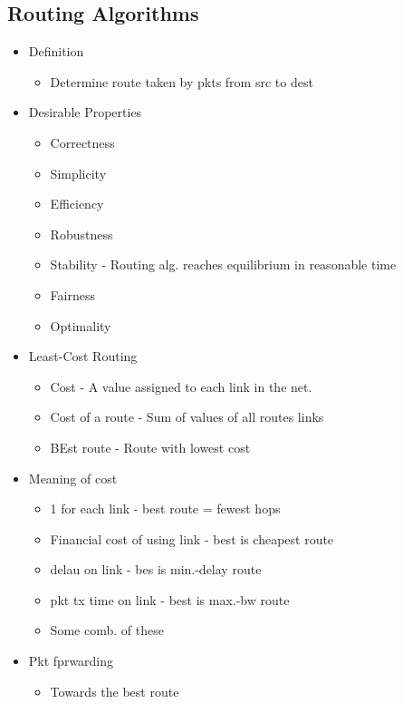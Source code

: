 \documentclass[a4paper]{article}
\begin{document}
\subsection{Routing Algorithms}
\begin{itemize}
	\item Definition
	\begin{itemize}
		\item Determine route taken by pkts from src to dest
	\end{itemize}
	\item Desirable Properties
	\begin{itemize}
		\item Correctness
		\item Simplicity
		\item Efficiency
		\item Robustness
		\item Stability - Routing alg. reaches equilibrium in reasonable
			time
		\item Fairness
		\item Optimality
	\end{itemize}
	\item Least-Cost Routing
	\begin{itemize}
		\item Cost - A value assigned to each link in the net.
		\item Cost of a route - Sum of values of all routes links
		\item BEst route - Route with lowest cost
	\end{itemize}
	\item Meaning of cost
	\begin{itemize}
		\item 1 for each link - best route = fewest hops
		\item Financial cost of using link - best is cheapest route
		\item delau on link - bes is min.-delay route
		\item pkt tx time on link - best is max.-bw route
		\item Some comb. of these
	\end{itemize}
	\item Pkt fprwarding
	\begin{itemize}
		\item Towards the best route
	\end{itemize}
\end{itemize}
\end{document}

